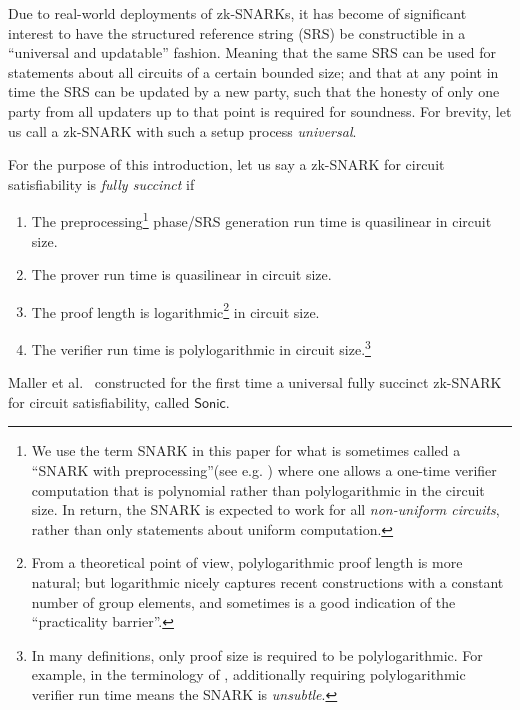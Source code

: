 \documentclass[11pt]{article} %
\newcommand{\sonic}{\ensuremath{\mathsf{Sonic}}\xspace}
\begin{document}
Due to real-world deployments of zk-SNARKs, it has become of significant interest to have the structured reference string (SRS) be constructible in a ``universal and updatable'' fashion. Meaning that the same SRS can be used for statements about all circuits of a certain bounded size; and that at any point in time the SRS can be updated by a new party, such that the honesty of only one party from all updaters up to that point is required for soundness.
For brevity, let us call a zk-SNARK with such a setup process \emph{universal}.


For the purpose of this introduction, let us say a zk-SNARK for circuit satisfiability is \emph{fully succinct}
if 

 \begin{enumerate}
\item The preprocessing\footnote{We use the term SNARK in this paper for what is sometimes called a ``SNARK with preprocessing''(see e.g. \cite{GGPR}) where one allows a one-time verifier computation that is polynomial rather than polylogarithmic in the circuit size. In return, the SNARK is expected to work for all \emph{non-uniform circuits}, rather than only statements about uniform computation.} 
 phase/SRS generation run time is quasilinear in circuit size.
\item The prover run time is quasilinear in circuit size.
\item The proof length is logarithmic\footnote{From a theoretical point of view, polylogarithmic proof length is more natural; but logarithmic nicely captures recent constructions with a constant number of group elements, and sometimes is a good indication of the ``practicality barrier''.} in circuit size.
\item The verifier run time is polylogarithmic in circuit size.\footnote{
In many definitions, only proof size is required to be polylogarithmic. 
For example, in the terminology of \cite{GGPR}, additionally requiring polylogarithmic verifier run time means the SNARK is \emph{unsubtle}.}

\end{enumerate}




Maller et al.\ \cite{sonic} constructed for the first time a universal fully succinct zk-SNARK for circuit satisfiability, called \sonic.
\end{document}
